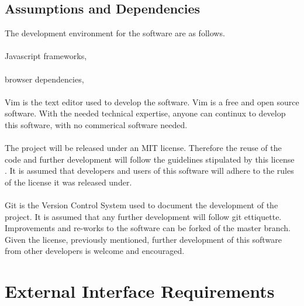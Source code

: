 \documentclass{article}
\newcommand{\comment}[1]{}
\begin{document}
\subsection{Assumptions and Dependencies}
\comment{
List any assumed factors (as opposed to known facts) that could affect the requirements stated in the SRS. These could include third-party or commercial components that you plan to use, issues around the development environment, or constraints. The project could be affected if these assumptions are incorrect, are not shared, or change. Also identify any dependencies the project has on external factors, such as software components that you intent to reuse from another project, unless they are already documented elsewhere (for example, in the vision and scope document or the project plan)
	}
The development environment for the software are as follows. 
\\ \\ 
Javascript frameworks, 
\\ \\ 
browser dependencies, 
\\ \\ 
Vim is the text editor used to develop the software. Vim is a free and open source software. With the needed technical expertise, anyone can continux to develop this software, with no commerical software needed. 
\\ \\ 
The project will be released under an MIT license. Therefore the reuse of the code and further development will follow the guidelines stipulated by this license \parencite{mit20}. It is assumed that developers and users of this software will adhere to the rules of the license it was released under.
\\ \\ 
Git is the Version Control System used to document the development of the project. It is assumed that any further development will follow git ettiquette. Improvements and re-works to the software can be forked of the master branch. Given the license, previously mentioned, further development of this software from other developers is welcome and encouraged.
\newpage

\section{External Interface Requirements}
\end{document}
